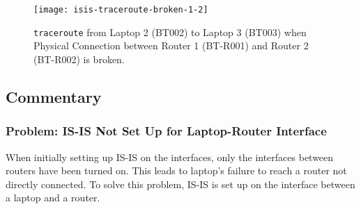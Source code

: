 \begin{figure}[ht!]
    \centering
    \texttt{[image: isis-traceroute-broken-1-2]}
    \caption{\texttt{traceroute} from Laptop 2 (BT002) to Laptop 3 (BT003) when Physical Connection between Router 1 (BT-R001) and Router 2 (BT-R002) is broken.}
    \label{fig:isis-traceroute-broken}
\end{figure}


\subsection{Commentary}

\subsubsection{Problem: IS-IS Not Set Up for Laptop-Router Interface}
When initially setting up IS-IS on the interfaces, only the interfaces between routers have been turned on. This leads to laptop's failure to reach a router not directly connected.
To solve this problem, IS-IS is set up on the interface between a laptop and a router.




